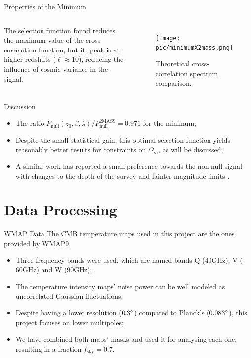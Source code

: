 \documentclass[serif, aspectratio=169]{beamer}
\begin{document}
\begin{frame}{Properties of the Minimum}
    \begin{columns}
        The selection function found reduces the maximum value of the cross-correlation function, but its peak is at higher redshifts ($\ell\approx 10$), reducing the influence of cosmic variance in the signal.
        
        \begin{figure}
            \centering
            \texttt{[image: pic/minimumX2mass.png]}
            \caption{Theoretical cross-correlation spectrum comparison.}
            \label{fig:minimum_cross_corr}
        \end{figure}
    \end{columns}
\end{frame}

\begin{frame}{Discussion}
    \begin{itemize}
        \item The ratio $P_\text{null}(z_0,\beta, \lambda)/P_\text{null}^\text{2MASS}=0.971$ for the minimum;
        \item Despite the small statistical gain, this optimal selection function yields reasonably better results for constraints on $\Omega_m$, as will be discussed;
        \item A similar work has reported a small preference towards the non-null signal with changes to the depth of the survey and fainter magnitude limits \cite{simillar_ISW_analysis}.
    \end{itemize}
\end{frame}

\section{Data Processing}

\begin{frame}{WMAP Data}
The CMB temperature maps used in this project are the ones provided by WMAP9.

\begin{itemize}
	\item Three frequency bands were used, which are named bands Q ($40\text{GHz}$), V ($60\text{GHz}$) and W ($90\text{GHz}$);
	\item The temperature intensity maps' noise power can be well modeled as uncorrelated Gaussian fluctuations;
	\item Despite having a lower resolution ($0.3\degree$) compared to Planck's ($0.083\degree$), this project focuses on lower multipoles;
	\item We have combined both maps' masks and used it for analysing each one, resulting in a fraction $f_\text{sky}=0.7$.
\end{itemize}
\end{frame}
\end{document}
